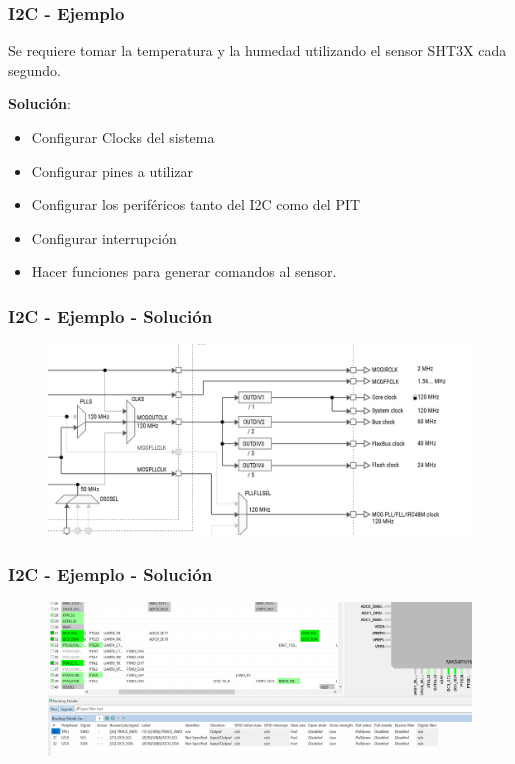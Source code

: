 \documentclass[10.5pt,scale=1.0,t,aspectratio=169,hyperref={pdfpagelabels=false}]{beamer}
\begin{document}
\begin{frame}
	\frametitle{I2C - Ejemplo}
	{\small
		Se requiere tomar la temperatura y la humedad utilizando el sensor SHT3X cada segundo. 
		
		\textbf{Solución}:
		
		\begin{itemize}
			\item Configurar Clocks del sistema
			\item Configurar pines a utilizar
			\item Configurar los periféricos tanto del I2C como del PIT
			\item Configurar interrupción
			\item Hacer funciones para generar comandos al sensor.
		\end{itemize}
	}
\end{frame}
\begin{frame}
	\frametitle{I2C - Ejemplo - Solución}
	\begin{figure}
		\centering
		\includegraphics[scale=0.5]{19_ClockConfig}
	\end{figure}
\end{frame}
\begin{frame}
	\frametitle{I2C - Ejemplo - Solución}
	\begin{figure}
		\centering
		\includegraphics[scale=0.35]{31_I2CConfig}
	\end{figure}
\end{frame}
\end{document}
